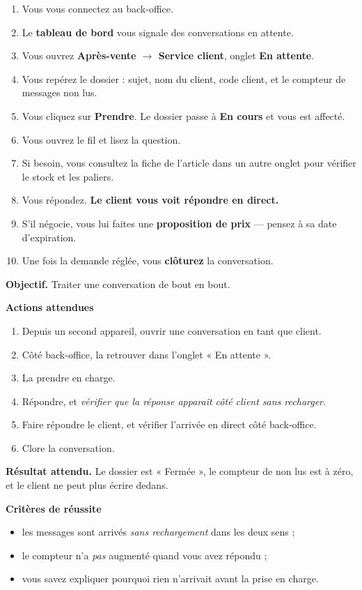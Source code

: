 \documentclass[11pt,a4paper]{report}
\begin{document}
\begin{enumerate}[leftmargin=*,itemsep=4pt]
  \item Vous vous connectez au back-office.
  \item Le \textbf{tableau de bord} vous signale des conversations en attente.
  \item Vous ouvrez \textbf{Après-vente $\rightarrow$ Service client}, onglet
        \textbf{En attente}.
  \item Vous repérez le dossier : sujet, nom du client, code client, et le
        compteur de messages non lus.
  \item Vous cliquez sur \textbf{Prendre}. Le dossier passe à \textbf{En cours}
        et vous est affecté.
  \item Vous ouvrez le fil et lisez la question.
  \item Si besoin, vous consultez la fiche de l'article dans un autre onglet
        pour vérifier le stock et les paliers.
  \item Vous répondez. \textbf{Le client vous voit répondre en direct.}
  \item S'il négocie, vous lui faites une \textbf{proposition de prix} — pensez
        à sa date d'expiration.
  \item Une fois la demande réglée, vous \textbf{clôturez} la conversation.
\end{enumerate}

\begin{exercice}
\textbf{Objectif.} Traiter une conversation de bout en bout.

\medskip
\textbf{Actions attendues}
\begin{enumerate}[leftmargin=*,itemsep=1pt,topsep=2pt]
  \item Depuis un second appareil, ouvrir une conversation en tant que client.
  \item Côté back-office, la retrouver dans l'onglet « En attente ».
  \item La prendre en charge.
  \item Répondre, et \emph{vérifier que la réponse apparaît côté client sans
        recharger}.
  \item Faire répondre le client, et vérifier l'arrivée en direct côté
        back-office.
  \item Clore la conversation.
\end{enumerate}

\medskip
\textbf{Résultat attendu.} Le dossier est « Fermée », le compteur de non lus est
à zéro, et le client ne peut plus écrire dedans.

\medskip
\textbf{Critères de réussite}
\begin{itemize}[leftmargin=*,itemsep=1pt,topsep=2pt]
  \item les messages sont arrivés \emph{sans rechargement} dans les deux sens ;
  \item le compteur n'a \emph{pas} augmenté quand vous avez répondu ;
  \item vous savez expliquer pourquoi rien n'arrivait avant la prise en charge.
\end{itemize}
\end{exercice}
\end{document}
